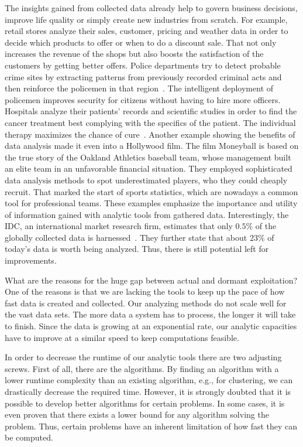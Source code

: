The insights gained from collected data already help to govern business decisions, improve life quality or simply create new industries from scratch.
For example, retail stores analyze their sales, customer, pricing and weather data in order to decide which products to offer or when to do a discount sale.
That not only increases the revenue of the shops but also boosts the satisfaction of the customers by getting better offers. 
Police departments try to detect probable crime sites by extracting patterns from previously recorded criminal acts and then reinforce the policemen in that region~\cite{lohr:yt2012a}.
The intelligent deployment of policemen improves security for citizens without having to hire more officers.
Hospitals analyze their patients' records and scientific studies in order to find the cancer treatment best complying with the specifics of the patient.
The individual therapy maximizes the chance of cure~\cite{watson:2013a}.
Another example showing the benefits of data analysis made it even into a Hollywood film.
The film Moneyball is based on the true story of the Oakland Athletics baseball team, whose management built an elite team in an unfavorable financial situation.
They employed sophisticated data analysis methods to spot underestimated players, who they could cheaply recruit.
That marked the start of sports statistics, which are nowadays a common tool for professional teams.
These examples emphasize the importance and utility of information gained with analytic tools from gathered data.
Interestingly, the IDC, an international market research firm, estimates that only $0.5\%$ of the globally collected data is harnessed~\cite{gantz:iaf2012a}.
They further state that about $23\%$ of today's data is worth being analyzed.
Thus, there is still potential left for improvements.

What are the reasons for the huge gap between actual and dormant exploitation?
One of the reasons is that we are lacking the tools to keep up the pace of how fast data is created and collected.
Our analyzing methods do not scale well for the vast data sets.
The more data a system has to process, the longer it will take to finish.
Since the data is growing at an exponential rate, our analytic capacities have to improve at a similar speed to keep computations feasible.

In order to decrease the runtime of our analytic tools there are two adjusting screws.
First of all, there are the algorithms.
By finding an algorithm with a lower runtime complexity than an existing algorithm, e.g., for clustering, we can drastically decrease the required time.
However, it is strongly doubted that it is possible to develop better algorithms for certain problems.
In some cases, it is even proven that there exists a lower bound for any algorithm solving the problem.
Thus, certain problems have an inherent limitation of how fast they can be computed.

